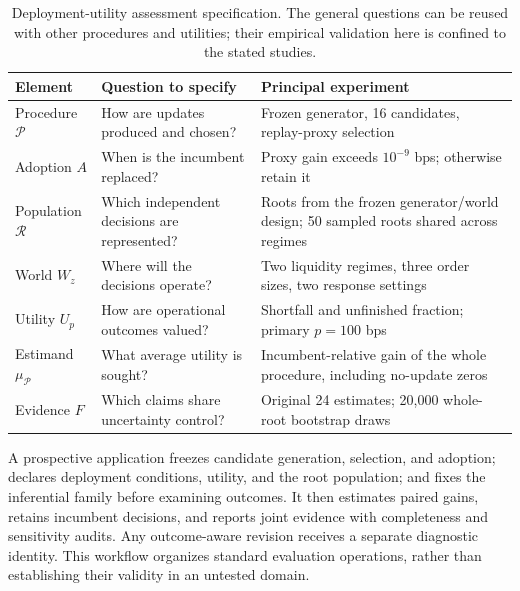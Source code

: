 \documentclass[10pt,letterpaper]{article}
\begin{document}
\begin{table}[t]\centering\small
\begin{tabular}{@{}p{.18\linewidth}p{.32\linewidth}p{.43\linewidth}@{}}\toprule
Element & Question to specify & Principal experiment\\\midrule
Procedure $\mathcal P$ & How are updates produced and chosen? & Frozen generator, 16 candidates, replay-proxy selection\\
Adoption $A$ & When is the incumbent replaced? & Proxy gain exceeds $10^{-9}$ bps; otherwise retain it\\
Population $\mathcal R$ & Which independent decisions are represented? & Roots from the frozen generator/world design; 50 sampled roots shared across regimes\\
World $W_z$ & Where will the decisions operate? & Two liquidity regimes, three order sizes, two response settings\\
Utility $U_p$ & How are operational outcomes valued? & Shortfall and unfinished fraction; primary $p=100$ bps\\
Estimand $\mu_{\mathcal P}$ & What average utility is sought? & Incumbent-relative gain of the whole procedure, including no-update zeros\\
Evidence $F$ & Which claims share uncertainty control? & Original 24 estimates; 20,000 whole-root bootstrap draws\\\bottomrule
\end{tabular}
\caption{Deployment-utility assessment specification. The general questions can be reused with other procedures and utilities; their empirical validation here is confined to the stated studies.}\label{tab:specification}
\end{table}

A prospective application freezes candidate generation, selection, and adoption; declares deployment conditions, utility, and the root population; and fixes the inferential family before examining outcomes. It then estimates paired gains, retains incumbent decisions, and reports joint evidence with completeness and sensitivity audits. Any outcome-aware revision receives a separate diagnostic identity. This workflow organizes standard evaluation operations, rather than establishing their validity in an untested domain.
\end{document}
